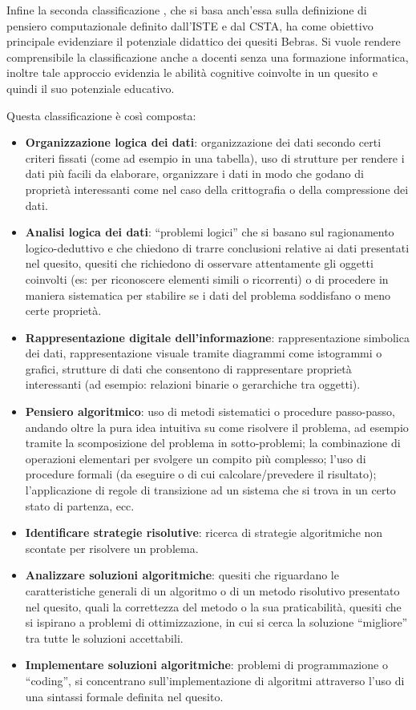 \documentclass[12pt]{report}
\begin{document}
Infine la seconda classificazione \cite{LonatiITICSE2017}, che si basa anch'essa sulla definizione di pensiero computazionale definito dall'ISTE e dal CSTA, ha come obiettivo principale evidenziare il potenziale didattico dei quesiti Bebras.
Si vuole rendere comprensibile la classificazione anche a docenti senza una formazione informatica, inoltre tale approccio evidenzia le abilità cognitive coinvolte in un quesito e quindi il suo potenziale educativo.

Questa classificazione è così composta:
\begin{itemize}
	\item \textbf{Organizzazione logica dei dati}: organizzazione dei dati secondo certi criteri fissati (come ad esempio in una tabella), uso di strutture per rendere i dati più facili da elaborare, organizzare i dati in modo che godano di proprietà interessanti come nel caso della crittografia o della compressione dei dati.
	\item \textbf{Analisi logica dei dati}: “problemi logici” che si basano sul ragionamento logico-deduttivo e che chiedono di trarre conclusioni relative ai dati presentati nel quesito, quesiti che richiedono di osservare attentamente gli oggetti coinvolti (es: per riconoscere elementi simili o ricorrenti) o di procedere in maniera sistematica per stabilire se i dati del problema soddisfano o meno certe proprietà.
	\item \textbf{Rappresentazione digitale dell'informazione}: rappresentazione simbolica dei dati, rappresentazione visuale tramite diagrammi come istogrammi o grafici, strutture di dati che consentono di rappresentare proprietà interessanti (ad esempio: relazioni binarie o gerarchiche tra oggetti).
	\item \textbf{Pensiero algoritmico}: uso di metodi sistematici o procedure passo-passo, andando oltre la pura idea intuitiva su come risolvere il problema, ad esempio tramite la scomposizione del problema in sotto-problemi; la combinazione di operazioni elementari per svolgere un compito più complesso; l’uso di procedure formali (da eseguire o di cui calcolare/prevedere il risultato); l’applicazione di regole di transizione ad un sistema che si trova in un certo stato di partenza, ecc.
	\item \textbf{Identificare strategie risolutive}: ricerca di strategie algoritmiche non scontate per risolvere un problema.
	\item \textbf{Analizzare soluzioni algoritmiche}: quesiti che riguardano le caratteristiche generali di un algoritmo o di un metodo risolutivo presentato nel quesito, quali la correttezza del metodo o la sua praticabilità, quesiti che si ispirano a problemi di ottimizzazione, in cui si cerca la soluzione “migliore” tra tutte le soluzioni accettabili.
	\item \textbf{Implementare soluzioni algoritmiche}: problemi di programmazione o “coding”, si concentrano sull’implementazione di algoritmi attraverso l’uso di una sintassi formale definita nel quesito.
\end{itemize}
\end{document}

